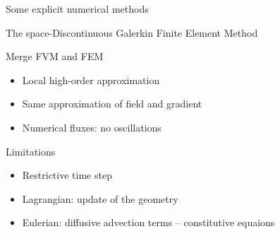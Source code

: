 \begin{withoutheadline}
  \begin{frame}{Some explicit numerical methods}
    \begin{block}{The space-Discontinuous Galerkin Finite Element Method \cite{Cockburn}}
      \begin{footnotesize}
        \begin{block}{\footnotesize Merge FVM and FEM}
          \vspace{-.2cm}
          \begin{itemize}
          \item[] Local high-order approximation \cite{NeutronDG}
          \item[] Same approximation of field and gradient
          \item[] Numerical fluxes: no oscillations
          \end{itemize}
        \end{block}
        \vspace{-.2cm}
        \begin{block}{\footnotesize Limitations}
          \vspace{-.2cm}
          \begin{itemize}
          \item[] Restrictive time step
          \item[] \alert{Lagrangian: update of the geometry \cite{LagrangianDG_thesis}}
          \item[] Eulerian: diffusive advection terms -- constitutive equaions 
          \end{itemize}
        \end{block}
      \end{footnotesize}
    \end{block}
  \end{frame}
\end{withoutheadline}


